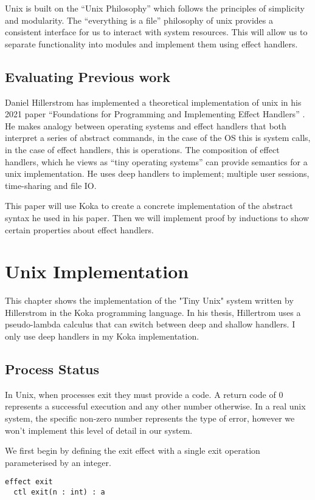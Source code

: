 \documentclass[logo,bsc,singlespacing,parskip]{infthesis}
\begin{document}
Unix is built on the “Unix Philosophy” which follows the principles of simplicity and modularity. The “everything is a file” philosophy of unix provides a consistent interface for us to interact with system resources. This will allow us to separate functionality into modules and implement them using effect handlers.

\section{Evaluating Previous work}
Daniel Hillerstrom has implemented a theoretical implementation of unix in his 2021 paper “Foundations for Programming and Implementing Effect Handlers” \cite{hillerstrom_foundations_nodate}. He makes analogy between operating systems and effect handlers that both interpret a series of abstract commands, in the case of the OS this is system calls, in the case of effect handlers, this is operations. The composition of effect handlers, which he views as “tiny operating systems” can provide semantics for a unix implementation. He uses deep handlers to implement; multiple user sessions, time-sharing and file IO.

This paper will use Koka to create a concrete implementation of the abstract syntax he used in his paper. Then we will implement proof by inductions to show certain properties about effect handlers.

\chapter{Unix Implementation}
This chapter shows the implementation of the "Tiny Unix" system written by Hillerstrom in the Koka programming language. In his thesis, Hillertrom uses a pseudo-lambda calculus that can switch between deep and shallow handlers. I only use deep handlers in my Koka implementation.

\section{Process Status}
In Unix, when processes exit they must provide a code. A return code of 0 represents a successful execution and any other number otherwise. In a real unix system, the specific non-zero number represents the type of error, however we won't implement this level of detail in our system.

We first begin by defining the exit effect with a single exit operation parameterised by an integer.
\begin{lstlisting}
effect exit
  ctl exit(n : int) : a
\end{lstlisting}
\end{document}
